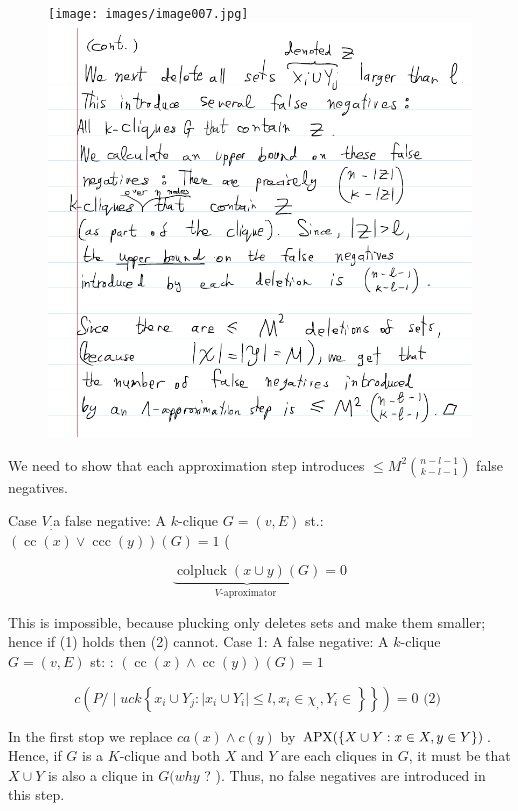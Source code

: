 \begin{figure}[H] 
    \centering
    \texttt{[image: images/image007.jpg]}
    \includegraphics{images/image008.png}
\end{figure}



\newpage

\iffalse
We need to show that each approximation step introduces $\leq M^2\binom{n-l-1}{k-l-1}$ false negatives.


Case $V_{:}$a false negative:
A $k$-clique $G=(v, E)$ st.: $(\operatorname{cc}(x) \vee \operatorname{ccc}(y))(G)=1$ (

$$
\underbrace{\operatorname{colpluck}(x \cup y)(G)}_{V \text {-aproximator }}=0
$$


This is impossible, because plucking only deletes sets and make them smaller; hence if (1) holds then (2) cannot.
Case 1:
A false negative:
A $k$-clique $G=(v, E)$ st: : $(\operatorname{cc}(x) \wedge \operatorname{cc}(y))(G)=1$

$$
\left.c\left(P / \mid u c k\left\{x_i \cup Y_j:\left|x_i \cup Y_i\right| \leq l, x_i \in \chi_{,}, Y_i \in\right\}\right\}\right)=0 \text { (2) }
$$


In the first stop we replace $c a(x) \wedge c(y)$ by $\mathrm{APX}(\{X \cup Y: x \in X, y \in Y\})$.
Hence, if $G$ is a $K$-clique and both $X$ and $Y$ are each cliques in $G$, it must be that $X \cup Y$ is also a clique in $G(w h y$ ? ). Thus, no false negatives are introduced in this step.


